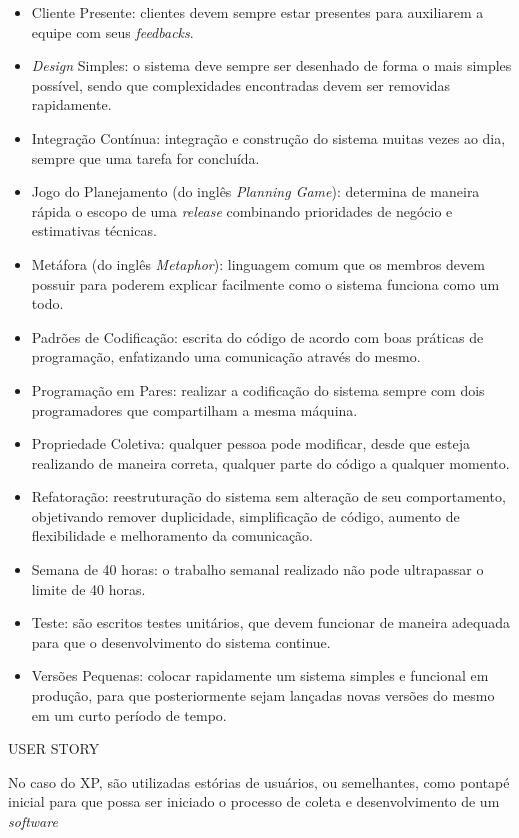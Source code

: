     \begin{itemize}
        \item Cliente Presente: clientes devem sempre estar presentes para auxiliarem a equipe com seus \textit{feedbacks}.
        \item \textit{Design} Simples: o sistema deve sempre ser desenhado de forma o mais simples possível, sendo que complexidades encontradas devem ser removidas rapidamente.
        \item Integração Contínua: integração e construção do sistema muitas vezes ao dia, sempre que uma tarefa
        for concluída.
        \item Jogo do Planejamento (do inglês \textit{Planning Game}): determina de maneira rápida o escopo de uma \textit{release} combinando prioridades de negócio e estimativas técnicas.
        \item Metáfora (do inglês \textit{Metaphor}): linguagem comum que os membros devem possuir para poderem explicar facilmente como o sistema funciona como um todo.
        \item Padrões de Codificação: escrita do código de acordo com boas práticas de programação, enfatizando uma comunicação através do mesmo.
        \item Programação em Pares: realizar a codificação do sistema sempre
        com dois programadores que compartilham a mesma máquina.
        \item Propriedade Coletiva: qualquer pessoa pode modificar, desde que esteja realizando de maneira correta, qualquer parte do código a qualquer momento.
        \item Refatoração: reestruturação do sistema sem alteração de seu comportamento, objetivando
        remover duplicidade, simplificação de código, aumento de flexibilidade e melhoramento da comunicação.
        \item Semana de 40 horas: o trabalho semanal realizado não pode ultrapassar o limite de 40 horas.
        \item Teste: são escritos testes unitários, que devem funcionar de maneira adequada para que
        o desenvolvimento do sistema continue.
        \item Versões Pequenas: colocar rapidamente um sistema simples e funcional em produção, para que posteriormente sejam lançadas novas versões do mesmo em um curto período de tempo.
    \end{itemize}

    USER STORY

    No caso do XP, são utilizadas estórias de usuários, ou semelhantes, como pontapé inicial para que possa ser iniciado o processo de coleta e desenvolvimento de um \textit{software}

